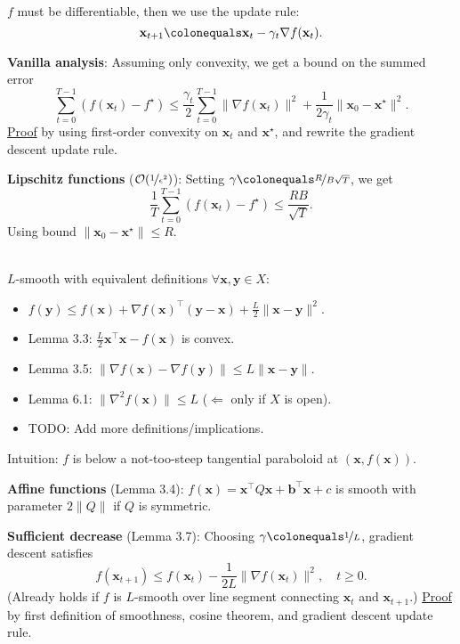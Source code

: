 \documentclass{article}
\renewcommand{\vec}[1]{\mathbf{#1}}
\newcommand{\mat}[1]{#1}
\newcommand{\transpose}[1]{#1^\top}
\newenvironment{topic}[1]
{\textbf{\sffamily \colorbox{black}{\rlap{\textbf{\textcolor{white}{#1}}}\hspace{\linewidth}\hspace{-2\fboxsep}}} \\ \vspace{0.2cm}}
{}
\begin{document}
\begin{multicols*}{2}
    \begin{topic}{3 Gradient descent}
        $f$ must be differentiable, then we use the update rule: \[
            \vec{x}_{t+1} \colonequals \vec{x}_t - \gamma_t \nabla f(\vec{x}_t).
        \]

        \textbf{Vanilla analysis}: Assuming only convexity, we get a bound on the summed error \[
            \sum_{t=0}^{T-1} (f(\vec{x}_t) - f^\star) \leq \frac{\gamma_t}{2} \sum_{t=0}^{T-1} \| \nabla f(\vec{x}_t) \|^2 + \frac{1}{2 \gamma_t} \| \vec{x}_0 - \vec{x}^\star \|^2.
        \]
        \underline{Proof} by using first-order convexity on $\vec{x}_t$ and $\vec{x}^\star$, and rewrite the gradient
        descent update rule.

        \textbf{Lipschitz functions} ($\mathcal{O}(\nicefrac{1}{\epsilon^2})$): Setting
        $\gamma \colonequals \nicefrac{R}{B \sqrt{T}}$, we get \[
            \frac{1}{T} \sum_{t=0}^{T-1} (f(\vec{x}_t) - f^\star) \leq \frac{RB}{\sqrt{T}}.
        \]
        Using bound $\| \vec{x}_0 - \vec{x}^\star \| \leq R$.
    \end{topic}

    \begin{topic}{3 Smooth functions}
        $L$-smooth with equivalent definitions $\forall \vec{x}, \vec{y} \in X$:
        \begin{itemize}
            \item $f(\vec{y}) \leq f(\vec{x}) + \transpose{\nabla f(\vec{x})} (\vec{y} - \vec{x}) + \frac{L}{2} \| \vec{x} - \vec{y} \|^2$.
            \item Lemma 3.3: $\frac{L}{2} \transpose{\vec{x}} \vec{x} - f(\vec{x})$ is convex.
            \item Lemma 3.5: $\| \nabla f(\vec{x}) - \nabla f(\vec{y}) \| \leq L \| \vec{x} - \vec{y} \|$.
            \item Lemma 6.1: $\| \nabla^2 f(\vec{x}) \| \leq L$ ($\Leftarrow$ only if $X$ is open).
            \item TODO: Add more definitions/implications.
        \end{itemize}
        Intuition: $f$ is below a not-too-steep tangential paraboloid at $(\vec{x}, f(\vec{x}))$.

        \textbf{Affine functions} (Lemma 3.4): $f(\vec{x}) = \transpose{\vec{x}} \mat{Q} \vec{x} +
            \transpose{\vec{b}} \vec{x} + c$ is smooth with parameter $2 \| \mat{Q} \|$ if $\mat{Q}$ is
        symmetric.

        \textbf{Sufficient decrease} (Lemma 3.7): Choosing $\gamma \colonequals \nicefrac{1}{L}$, gradient descent satisfies \[
            f(\vec{x}_{t+1}) \leq f(\vec{x}_t) - \frac{1}{2L} \| \nabla f(\vec{x}_t) \|^2, \quad t \geq 0.
        \]
        (Already holds if $f$ is $L$-smooth over line segment connecting $\vec{x}_t$ and $\vec{x}_{t+1}$.)
        \underline{Proof} by first definition of smoothness, cosine theorem, and gradient descent update rule.


\end{topic}
\end{multicols*}
\end{document}

